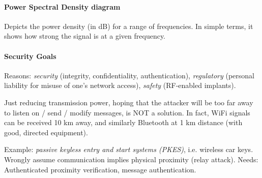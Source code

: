 \paragraph{Power Spectral Density diagram}
Depicts the power density (in dB) for a range of frequencies.
In simple terms, it shows how strong the signal is at a given frequency.


\paragraph{Security Goals}
Reasons: \textit{security} (integrity, confidentiality, authentication), \textit{regulatory} (personal liability for misuse of one's network access), \textit{safety} (RF-enabled implants).

Just reducing transmission power, hoping that the attacker will be too far away to listen on / send / modify messages, is NOT a solution.
In fact, WiFi signals can be received 10 km away, and similarly Bluetooth at 1 km distance (with good, directed equipment).

Example: \textit{passive keyless entry and start systems (PKES)}, i.e. wireless car keys.
Wrongly assume communication implies physical proximity (relay attack).
Needs: Authenticated proximity verification, message authentication.
